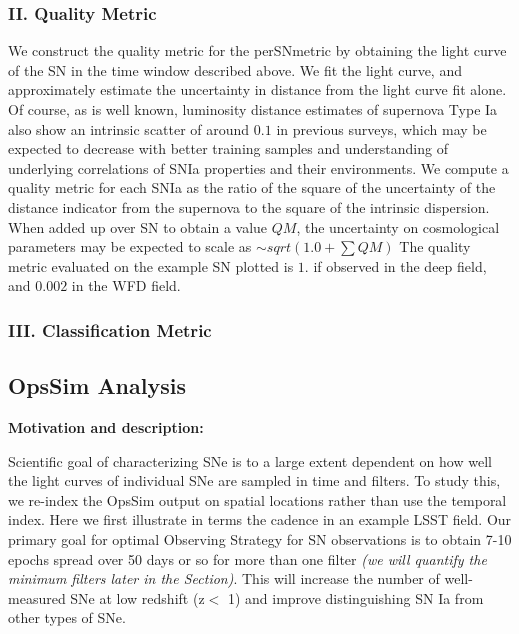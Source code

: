 \subsubsection{II. Quality Metric}
We construct the quality metric for the perSNmetric by obtaining the light curve of the SN
in the time window described above. We fit the light curve, and approximately estimate the
uncertainty in distance from the light curve fit alone. Of course, as is well known,
luminosity distance estimates of supernova Type Ia also show an intrinsic scatter of
around $0.1$ in previous surveys, which may be expected to decrease with better training
samples and understanding of underlying correlations of SNIa properties and their
environments. We compute a quality metric for each SNIa as the ratio of the square of the
uncertainty of the distance indicator from the supernova to the square of the intrinsic
dispersion. When added up over SN to obtain a value $QM$, the uncertainty on cosmological
parameters may be expected to scale as $\sim sqrt(1.0 + \sum QM)$ The quality metric
evaluated on the example SN plotted is $1.$ if observed in the deep field, and $0.002$ in
the WFD field.


\subsubsection{III. Classification Metric}


\subsection{OpsSim Analysis}
\label{sec:keyword:analysis}

{\bf Motivation and description:}

Scientific goal of characterizing SNe is to a large extent dependent on
how well the light curves of individual SNe are sampled in time and filters. To study
this, we re-index the OpsSim output on spatial locations rather than use the temporal
index. Here we first
illustrate  in terms the cadence in an example LSST field. Our primary goal for optimal Observing
Strategy for SN observations is to obtain 7-10 epochs spread over 50 days or so for more than one filter {\it (we
will quantify the minimum filters later in the Section)}. This will increase the number of
well-measured SNe at low redshift (z$<$ 1) and improve distinguishing SN Ia from other
types of SNe.

